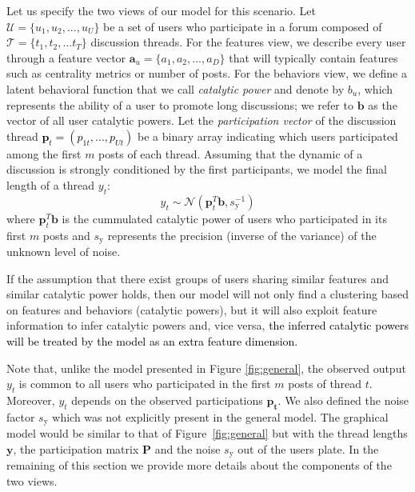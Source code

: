\documentclass[smallextended]{svjour3}          %
\newcommand\alberto[1]{\textcolor{black}{#1}}
\begin{document}
Let us specify the two views of our model for this scenario. Let $\mathcal{U} = \{u_1, u_2,...,u_U\}$ be a set of users who participate in a forum composed of $\mathcal{T} = \{t_1,t_2,...t_T \}$ discussion threads. For the features view, we describe every user through a feature vector $\mathbf{a}_u=\{a_1, a_2,...,a_D\}$ that will typically contain features such as centrality metrics or number of posts. For the behaviors view, we define a latent behavioral function that we call \textit{catalytic power} and denote by $b_u$, which represents the ability of a user to promote long discussions; we refer to $\mathbf{b}$ as the vector of all user catalytic powers. Let the \textit{participation vector} of the discussion thread \alberto{$\mathbf{p}_t = (p_{1t},...,p_{Ut})$} be a binary array indicating which users participated among the first $m$ posts of each thread. Assuming  that the dynamic of a discussion is strongly conditioned by the first participants, we model the final length of a thread $y_t$:
\begin{equation*}
y_t \sim \mathcal{N}(\mathbf{p}_t^T\mathbf{b}, s_{\text{y}}^{-1})
\end{equation*} 
where $\mathbf{p}_t^T\mathbf{b}$ is the cummulated catalytic power of users who participated in its first $m$ posts and $s_{\text{y}}$ represents the precision (inverse of the variance) of the unknown level of noise.

If the assumption that there exist groups of users sharing similar features and similar catalytic power holds, then our model will not only find a clustering based on features and behaviors (catalytic powers), but it will also exploit feature information to infer catalytic powers and, vice versa, \alberto{the inferred catalytic powers will be treated by the model as an extra feature dimension.}

Note that, unlike the model presented in Figure \ref{fig:general}, the observed output $y_t$ is common to all users who participated in the first $m$ posts of thread $t$. Moreover, $y_t$ depends on the observed participations $\mathbf{p_t}$. We also defined the noise factor $s_{\text{y}}$ which was not explicitly present in the general model. The graphical model would be similar to that of Figure~\ref{fig:general} but with the thread lengths $\mathbf{y}$, the participation matrix $\mathbf{P}$ and the noise $s_{\text{y}}$ out of the users plate. In the remaining of this section we provide more details about the components of the two views.
\end{document}
